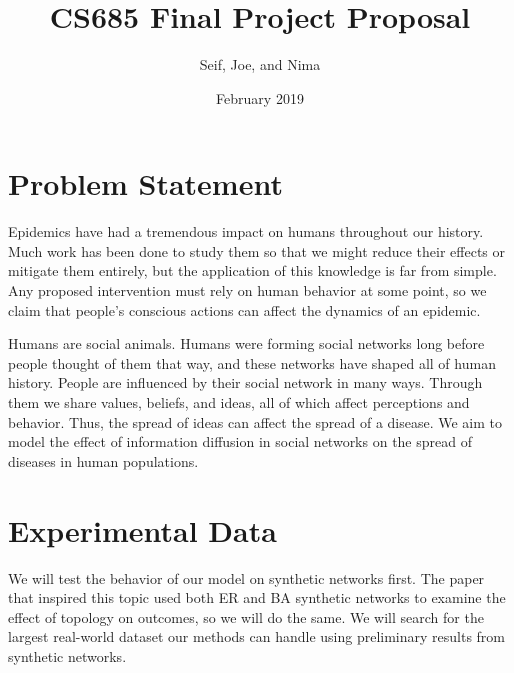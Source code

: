 \documentclass{article}
\title{CS685 Final Project Proposal}
\author{Seif, Joe, and Nima}
\date{February 2019}
\begin{document}
\maketitle

\section{Problem Statement}
Epidemics have had a tremendous impact on humans throughout our history. Much work has been done to study them so that we might reduce their effects or mitigate them entirely, but the application of this knowledge is far from simple. Any proposed intervention must rely on human behavior at some point, so we claim that people's conscious actions can affect the dynamics of an epidemic.

Humans are social animals. Humans were forming social networks long before people thought of them that way, and these networks have shaped all of human history. People are influenced by their social network in many ways. Through them we share values, beliefs, and ideas, all of which affect perceptions and behavior. Thus, the spread of ideas can affect the spread of a disease. We aim to model the effect of information diffusion in social networks on the spread of diseases in human populations.

\section{Experimental Data}
We will test the behavior of our model on synthetic networks first. The paper that inspired this topic used both ER and BA synthetic networks to examine the effect of topology on outcomes, so we will do the same. We will search for the largest real-world dataset our methods can handle using preliminary results from synthetic networks.
\end{document}
